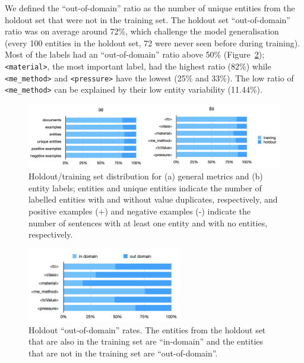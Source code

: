 \documentclass[]{interact}
\theoremstyle{plain}%
\theoremstyle{definition}
\theoremstyle{remark}
\begin{document}
We defined the ``out-of-domain'' ratio as the number of unique entities from the holdout set that were not in the training set.
The holdout set ``out-of-domain'' ratio was on average around 72\%, which challenge the model generalisation (every 100 entities in the holdout set, 72 were never seen before during training).
Most of the labels had an ``out-of-domain'' ratio above 50\%  (Figure~\ref{fig:out-domain-holdout});  \texttt{<material>}, the most important label, had the highest ratio (82\%) while \texttt{<me\_method>} and \texttt{<pressure>} have the lowest (25\% and 33\%). 
The low ratio of \texttt{<me\_method>} can be explained by their low entity variability (11.44\%).

\begin{figure}[ht]
    \centering
    \includegraphics[width=\textwidth]{superconductor-holdout-training-set}
    \caption{Holdout/training set distribution for (a) general metrics and (b) entity labels; entities and unique entities indicate the number of labelled entities with and without value duplicates, respectively, and positive examples (+) and negative examples (-) indicate the number of sentences with at least one entity and with no entities, respectively.}
    \label{fig:training-holdout-set-distribution}
\end{figure}

\begin{figure}[ht]
    \centering
    \includegraphics[width=0.6\textwidth]{superconductor-out-domain-holdout-unique}
    \caption{Holdout ``out-of-domain'' rates. The entities from the holdout set that are also in the training set are ``in-domain'' and the entities that are not in the training set are ``out-of-domain''.}
    \label{fig:out-domain-holdout}
\end{figure}
\end{document}
